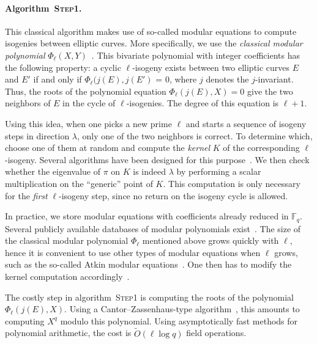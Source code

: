 \documentclass{article}
\newcommand{\F}{\mathbb{F}}
\newcommand{\softO}{\tilde{O}}
\newcommand{\algstyle}[1]{\textsc{#1}}
\theoremstyle{definition}
\begin{document}
\paragraph{Algorithm~\algstyle{Step1}.} This classical algorithm makes use
of so-called modular equations to compute isogenies between elliptic
curves. More specifically, we use the \emph{classical modular polynomial}
$\Phi_\ell(X, Y)$~\cite{todo:classicalmodpoly}.
This bivariate polynomial with integer coefficients has
the following property: a cyclic $\ell$-isogeny exists between two elliptic
curves $E$ and $E'$ if and only if $\Phi_\ell(j(E), j(E')$ = 0,
where $j$ denotes the $j$-invariant. Thus, the roots
of the polynomial equation $\Phi_\ell(j(E), X)=0$ give the two neighbors
of $E$ in the cycle of $\ell$-isogenies. The degree of this equation
is $\ell+1$.

Using this idea, when one picks a new prime $\ell$ and starts a sequence
of isogeny steps in direction $\lambda$, only one of the two neighbors is
correct. To determine which, choose one of them at random and
compute the \emph{kernel} $K$ of the corresponding $\ell$-isogeny. Several
algorithms have been designed for this purpose~\cite{todo:isogkernel}.
We then check whether the eigenvalue of $\pi$ on $K$ is indeed $\lambda$
by performing a scalar multiplication on the ``generic'' point of $K$.
This computation is only necessary for the \emph{first} $\ell$-isogeny
step, since no return on the isogeny cycle is allowed.

In practice, we store modular equations with coefficients already reduced
in $\F_q$. Several publicly available databases of modular polynomials
exist~\cite{todo:modulardatabases}. The size of the classical modular polynomial
$\Phi_\ell$ mentioned above grows quickly with $\ell$, hence it is convenient
to use other types of modular equations when $\ell$ grows, such as the so-called
Atkin modular equations~\cite{todo:atkinmodpoly}. One then has to
modify the kernel computation accordingly~\cite{todo:isogkernelatkin}.

The costly step in algorithm~\algstyle{Step1} is computing the roots
of the polynomial $\Phi_\ell(j(E), X)$. Using a Cantor--Zassenhaus-type
algorithm~\cite{todo:canzass}, this amounts to computing $X^q$ modulo
this polynomial. Using asymptotically fast methods for polynomial
arithmetic, the cost is $\softO(\ell\log q)$ field operations.
\end{document}
